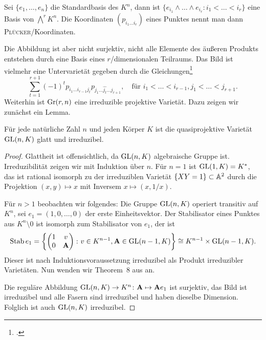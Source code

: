 Sei $\{e_1, \dots, e_n\}$ die Standardbasis des $K^n$, dann ist $\{e_{i_1} \wedge \dots \wedge e_{i_r} \colon i_1 < \dots < i_r\}$ eine Basis von $\bigwedge^r K^n$. Die Koordinaten $(p_{i_1 \dots i_r})$ eines Punktes nennt man dann \textsc{Plücker}\-/Koordinaten.

Die Abbildung ist aber nicht surjektiv, nicht alle Elemente des äußeren Produkts entstehen durch eine Basis eines $r$\-/dimensionalen Teilraums. Das Bild ist vielmehr eine Untervarietät gegeben durch die Gleichungen\footcite[siehe][S.~42]{Shafarevich}
\begin{equation} \label{eq:grcond}
\sum_{t=1}^{r+1} (-1)^t p_{i_1 \dots i_{r-1} j_t} p_{j_1 \dots \hat{j_t} \dots j_{r+1}}, \quad\text{für } i_1 < \dots < i_{r-1}, j_1 < \dots < j_{r+1}.
\end{equation}
Weiterhin ist $\grass r/n$ eine irreduzible projektive Varietät. Dazu zeigen wir zunächst ein Lemma.

\begin{prop}
Für jede natürliche Zahl $n$ und jeden Körper $K$ ist die quasiprojektive Varietät~$\mathrm{GL}(n,K)$ glatt und irreduzibel.
\end{prop}
\begin{proof}
Glattheit ist offensichtlich, da $\mathrm{GL}(n,K)$ algebraische Gruppe ist. Irreduzibilität zeigen wir mit Induktion über $n$. Für $n=1$ ist $\mathrm{GL}(1,K) = K^*$, das ist rational isomorph zu der irreduziblen Varietät $\{ XY = 1 \} \subset \mathbb A^{2}$ durch die Projektion $(x,y) \mapsto x$ mit Inversem $x \mapsto (x,1/x)$.

Für $n>1$ beobachten wir folgendes: Die Gruppe $\mathrm{GL}(n,K)$ operiert transitiv auf $K^n$, sei $e_1 = (1,0,\dots,0)$ der erste Einheitsvektor. Der Stabilisator eines Punktes aus $K^n \setminus 0$ ist isomorph zum Stabilisator von $e_1$, der ist
\begin{equation}
\operatorname{Stab} e_1 = \left\{ \begin{pmatrix}
1 & v \\
0 & \mathbf{A}
\end{pmatrix} \colon v \in K^{n-1}, \mathbf{A} \in \mathrm{GL}(n-1,K) \right\} \cong K^{n-1} \times \mathrm{GL}(n-1,K).
\end{equation}
Dieser ist nach Induktionsvoraussetzung irreduzibel als Produkt irreduzibler Varietäten. Nun wenden wir Theorem~8 aus \cite[S.~77]{Shafarevich} an.

Die reguläre Abbildung $\mathrm{GL}(n,K) \rightarrow K^n \colon \mathbf{A} \mapsto \mathbf{A} e_1$ ist surjektiv, das Bild ist irreduzibel und alle Fasern sind irreduzibel und haben dieselbe Dimension. Folglich ist auch $\mathrm{GL}(n,K)$ irreduzibel.
\end{proof}

